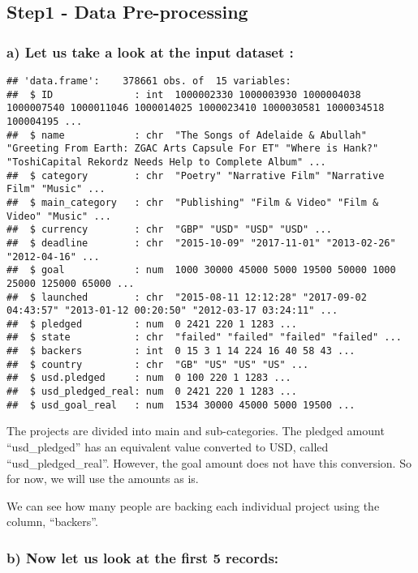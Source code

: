 \documentclass[]{article}
\begin{document}
\subsection{\texorpdfstring{{Step1 - Data
Pre-processing}}{Step1 - Data Pre-processing}}\label{step1---data-pre-processing}

\subsubsection{a) Let us take a look at the input dataset
:}\label{a-let-us-take-a-look-at-the-input-dataset}

\begin{verbatim}
## 'data.frame':    378661 obs. of  15 variables:
##  $ ID              : int  1000002330 1000003930 1000004038 1000007540 1000011046 1000014025 1000023410 1000030581 1000034518 100004195 ...
##  $ name            : chr  "The Songs of Adelaide & Abullah" "Greeting From Earth: ZGAC Arts Capsule For ET" "Where is Hank?" "ToshiCapital Rekordz Needs Help to Complete Album" ...
##  $ category        : chr  "Poetry" "Narrative Film" "Narrative Film" "Music" ...
##  $ main_category   : chr  "Publishing" "Film & Video" "Film & Video" "Music" ...
##  $ currency        : chr  "GBP" "USD" "USD" "USD" ...
##  $ deadline        : chr  "2015-10-09" "2017-11-01" "2013-02-26" "2012-04-16" ...
##  $ goal            : num  1000 30000 45000 5000 19500 50000 1000 25000 125000 65000 ...
##  $ launched        : chr  "2015-08-11 12:12:28" "2017-09-02 04:43:57" "2013-01-12 00:20:50" "2012-03-17 03:24:11" ...
##  $ pledged         : num  0 2421 220 1 1283 ...
##  $ state           : chr  "failed" "failed" "failed" "failed" ...
##  $ backers         : int  0 15 3 1 14 224 16 40 58 43 ...
##  $ country         : chr  "GB" "US" "US" "US" ...
##  $ usd.pledged     : num  0 100 220 1 1283 ...
##  $ usd_pledged_real: num  0 2421 220 1 1283 ...
##  $ usd_goal_real   : num  1534 30000 45000 5000 19500 ...
\end{verbatim}

The projects are divided into main and sub-categories. The pledged
amount ``usd\_pledged'' has an equivalent value converted to USD, called
``usd\_pledged\_real''. However, the goal amount does not have this
conversion. So for now, we will use the amounts as is.

We can see how many people are backing each individual project using the
column, ``backers''.

\subsubsection{b) Now let us look at the first 5
records:}\label{b-now-let-us-look-at-the-first-5-records}
\end{document}

